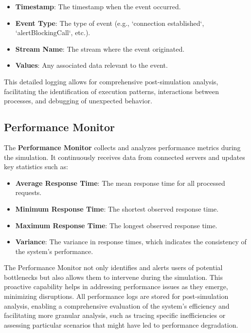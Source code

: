 \begin{itemize}
    \item \textbf{Timestamp}: The timestamp when the event occurred.
    \item \textbf{Event Type}: The type of event (e.g., `connection established`, `alertBlockingCall`, etc.).
    \item \textbf{Stream Name}: The stream where the event originated.
    \item \textbf{Values}: Any associated data relevant to the event.
\end{itemize}

This detailed logging allows for comprehensive post-simulation analysis, facilitating the identification of execution patterns, interactions between processes, and debugging of unexpected behavior.

\subsection{Performance Monitor}

The \textbf{Performance Monitor} collects and analyzes performance metrics during the simulation. It continuously receives data from connected servers and updates key statistics such as:

\begin{itemize}
    \item \textbf{Average Response Time}: The mean response time for all processed requests.
    \item \textbf{Minimum Response Time}: The shortest observed response time.
    \item \textbf{Maximum Response Time}: The longest observed response time.
    \item \textbf{Variance}: The variance in response times, which indicates the consistency of the system's performance.
\end{itemize}

The Performance Monitor not only identifies and alerts users of potential bottlenecks but also allows them to intervene during the simulation. This proactive capability helps in addressing performance issues as they emerge, minimizing disruptions. All performance logs are stored for post-simulation analysis, enabling a comprehensive evaluation of the system's efficiency and facilitating more granular analysis, such as tracing specific inefficiencies or assessing particular scenarios that might have led to performance degradation.

